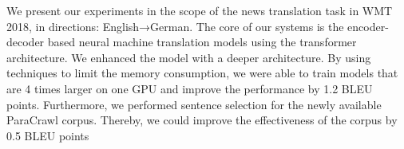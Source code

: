We present our experiments in the scope of the news translation task in WMT 2018, in directions: English→German. The core of our systems is the encoder-decoder based neural machine translation models using the transformer architecture. We enhanced the model with a deeper architecture. By using techniques to limit the memory consumption, we were able to train models that are 4 times larger on one GPU and improve the performance by 1.2 BLEU points. Furthermore, we performed sentence selection for the newly available ParaCrawl corpus. Thereby, we could improve the effectiveness of the corpus by 0.5 BLEU points
